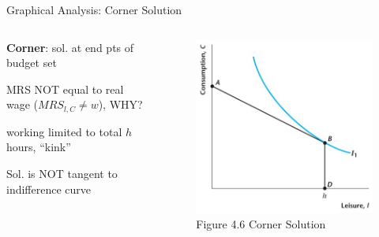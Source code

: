 \documentclass[11pt,aspectratio=169,usenames,dvipsnames]{beamer}
\let\tempone\itemize
\let\temptwo\enditemize
\renewenvironment{itemize}{\tempone\addtolength{\itemsep}{\fill}}{\temptwo}
\begin{document}
\begin{frame}{Graphical Analysis: Corner Solution}
\label{slide:Graphical_Analysis__Corner_Solution}
    \begin{columns}
        \begin{column}{0.5\textwidth}
            \begin{itemize}
                \item \textbf{Corner}: sol. at end pts of budget set
                \item \alert{MRS} \alert{NOT} equal to \alert{real wage} ($MRS_{l, C} \neq w$), WHY?
                \begin{itemize}
                    \item working limited to total $ h $ hours, ``kink''
                \end{itemize}
                \item Sol. is NOT tangent to indifference curve
            \end{itemize}
        \end{column}
        \begin{column}{0.5\textwidth}
            \begin{figure}
                \caption{Figure 4.6 Corner Solution}
                \includegraphics[width=.8\textwidth]{./figures/Figure4_6.jpg}
            \end{figure}
        \end{column}
    \end{columns}

\end{frame}
\end{document}

